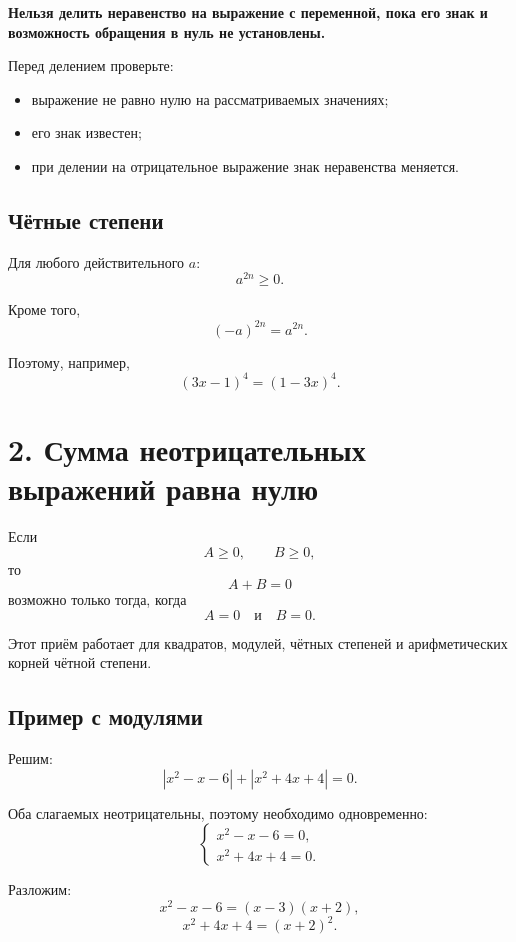 \documentclass[a4paper,12pt]{article}
\newcommand{\important}[1]{%
    {\color{warning}\bfseries #1}
}
\begin{document}
\important{
Нельзя делить неравенство на выражение с переменной,
пока его знак и возможность обращения в нуль не установлены.
}

Перед делением проверьте:

\begin{itemize}
    \item выражение не равно нулю на рассматриваемых значениях;
    \item его знак известен;
    \item при делении на отрицательное выражение знак неравенства меняется.
\end{itemize}

\subsection*{Чётные степени}

Для любого действительного \(a\):
\[
a^{2n}\ge0.
\]

Кроме того,
\[
(-a)^{2n}=a^{2n}.
\]

Поэтому, например,
\[
(3x-1)^4=(1-3x)^4.
\]


\section*{\color{darkaccent}
2. Сумма неотрицательных выражений равна нулю
}

Если
\[
A\ge0,\qquad B\ge0,
\]
то
\[
A+B=0
\]
возможно только тогда, когда
\[
\boxed{A=0\quad\text{и}\quad B=0}.
\]

Этот приём работает для квадратов, модулей, чётных степеней
и арифметических корней чётной степени.

\subsection*{Пример с модулями}

Решим:
\[
|x^2-x-6|+|x^2+4x+4|=0.
\]

Оба слагаемых неотрицательны, поэтому необходимо одновременно:
\[
\begin{cases}
x^2-x-6=0,\\
x^2+4x+4=0.
\end{cases}
\]

Разложим:
\[
x^2-x-6=(x-3)(x+2),
\]
\[
x^2+4x+4=(x+2)^2.
\]
\end{document}
